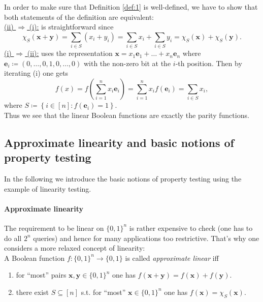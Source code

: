 \documentclass[a4paper]{article}
\newcommand{\nset}{[n]}
\newcommand{\boldx}{\boldsymbol{x}}
\newcommand{\boldy}{\boldsymbol{y}}
\newcommand{\bolde}{\boldsymbol{e}}
\theoremstyle{plain}
\theoremstyle{definition}
\theoremstyle{remark}
\begin{document}
\noindent In order to make sure that Definition
\ref{def:1} is well-defined, we have to show that both statements of
the definition are equivalent: \\
\underline{(ii) \(\Rightarrow\) (i):} is straightforward since 
\[\chi_S(\boldx+\boldy) = \sum_{i\in S} (x_i + y_i) = \sum_{i\in S} x_i +
\sum_{i\in S} y_i = \chi_S(\boldx) + \chi_S(\boldy).\]
\underline{(i) \(\Rightarrow\) (ii):} uses the representation \(\boldx =
x_1 \bolde_1 + \dots + x_n \bolde_n\) where \(\bolde_i \coloneqq
(0,\dots,0,1,0,\dots,0)\) with the non-zero bit at the \(i\)-th
position. Then by iterating (i) one gets 
\[f(x) = f\left(\sum_{i=1}^{n} x_i \bolde_i\right) = \sum_{i=1}^{n} x_i f(\bolde_i) =
\sum_{i\in S} x_i, \]
where \(S \coloneqq \left\{i\in \nset : f(\bolde_i) = 1 \right\}\). \\

\noindent Thus we see that the linear Boolean functions are exactly
the parity functions. 

\subsection{Approximate linearity and basic notions of property testing}
\label{sec:appr-line-basic}

In the following we introduce the basic notions of property testing
using the example of linearity testing. 

\paragraph{Approximate linearity}
\label{sec:appr-line}

The requirement to be linear on \(\{0,1\}^n\) is rather expensive to
check (one has to do all \(2^n\) queries) and hence for many
applications too restrictive. That's why one considers a more relaxed
concept of linearity: \\

\noindent A Boolean function \(f:\{0,1\}^n \rightarrow \{0,1\}\) is called
\emph{approximate linear} iff
\begin{enumerate}[label= (\roman*')]
\item for ``most'' pairs \(\boldx,\boldy \in \{0,1\}^n\) one has \(f(\boldx+\boldy) = f(\boldx)
  + f(\boldy)\).
\item there exist \(S \subseteq \nset\) s.t. for ``most'' \(\boldx\in
  \{0,1\}^n\) one has \(f(\boldx) = \chi_S(\boldx)\). 
\end{enumerate}
\end{document}
